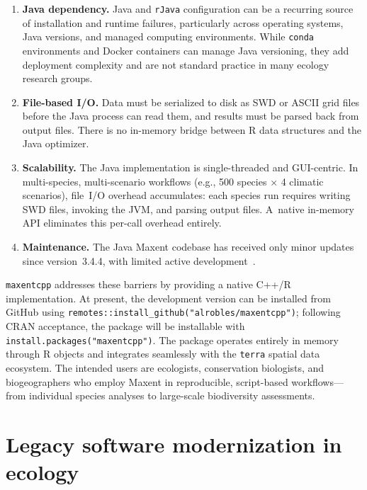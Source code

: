 \documentclass[10pt,letterpaper]{article}
\begin{document}
\begin{enumerate}[leftmargin=*,nosep]
  \item \textbf{Java dependency.}
    Java and \texttt{rJava} configuration can be a recurring source of
    installation and runtime failures, particularly across operating
    systems, Java versions, and managed computing environments.
    While \texttt{conda} environments and Docker containers can manage
    Java versioning, they add deployment complexity and are not standard
    practice in many ecology research groups.

  \item \textbf{File-based I/O.}
    Data must be serialized to disk as SWD or ASCII grid files before
    the Java process can read them, and results must be parsed back
    from output files.
    There is no in-memory bridge between R data structures and the Java
    optimizer.

  \item \textbf{Scalability.}
    The Java implementation is single-threaded and GUI-centric.
    In multi-species, multi-scenario workflows (e.g., 500
    species $\times$ 4 climatic scenarios), file~I/O overhead
    accumulates: each species run requires writing SWD files, invoking
    the JVM, and parsing output files.
    A~native in-memory API eliminates this per-call overhead entirely.

  \item \textbf{Maintenance.}
    The Java Maxent codebase has received only minor updates since
    version~3.4.4, with limited active development~\cite{Phillips2017}.
\end{enumerate}

\texttt{maxentcpp} addresses these barriers by providing a native C++/R
implementation.
At present, the development version can be installed from GitHub using
\texttt{remotes::install\_github("alrobles/maxentcpp")}; following CRAN
acceptance, the package will be installable with
\texttt{install.packages("maxentcpp")}.
The package operates entirely in memory through R objects and integrates
seamlessly with the \texttt{terra} spatial data ecosystem.
The intended users are ecologists, conservation biologists, and
biogeographers who employ Maxent in reproducible, script-based
workflows---from individual species analyses to large-scale biodiversity
assessments.

\section*{Legacy software modernization in ecology}
\end{document}
